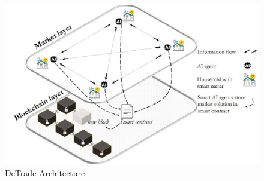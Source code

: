 \begin{figure}[h!]
    \centering
    \includegraphics[scale=0.3]{Figures/DeTrade.png}
    \caption{DeTrade Architecture \cite{DeTrade}}
\end{figure}

